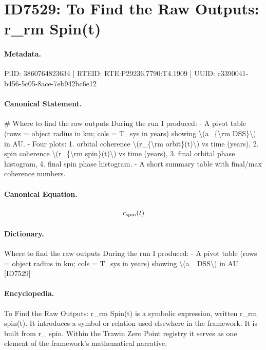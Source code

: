 \section*{ID7529: To Find the Raw Outputs: r\_rm Spin(t)}
\paragraph{Metadata.}
PiID: 3860764823634 | RTEID: RTE:P29236.7790:T4.1909 | UUID: c3390041-b456-5c05-8ace-7eb942bc6e12

\paragraph{Canonical Statement.}
\# Where to find the raw outputs During the run I produced: - A pivot table (rows = object radius in km; cols = T\_sys in years) showing \textbackslash{}(a\_\{\textbackslash{}rm DSS\}\textbackslash{}) in AU. - Four plots: 1. orbital coherence \textbackslash{}(r\_\{\textbackslash{}rm orbit\}(t)\textbackslash{}) vs time (years), 2. spin coherence \textbackslash{}(r\_\{\textbackslash{}rm spin\}(t)\textbackslash{}) vs time (years), 3. final orbital phase histogram, 4. final spin phase histogram. - A short summary table with final/max coherence numbers.

\paragraph{Canonical Equation.}
\[
r_{\rm spin}(t)
\]

\paragraph{Dictionary.}
Where to find the raw outputs During the run I produced: - A pivot table (rows = object radius in km; cols = T\_sys in years) showing \textbackslash{}(a\_ DSS\textbackslash{}) in AU [ID7529]

\paragraph{Encyclopedia.}
To Find the Raw Outputs: r\_rm Spin(t) is a symbolic expression, written r\_rm spin(t). It introduces a symbol or relation used elsewhere in the framework. It is built from r\_ spin. Within the Trawin Zero Point registry it serves as one element of the framework's mathematical narrative.
